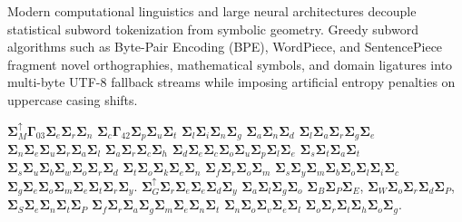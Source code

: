 \documentclass[10pt,oneside,letterpaper]{article}
\newcommand{\rosettaentry}[2]{%
  \begin{minipage}[t]{0.48\textwidth}
    \small\color{ink} #1
  \end{minipage}\hfill%
  \begin{minipage}[t]{0.48\textwidth}
    \small\ttfamily\color{cyan} #2
  \end{minipage}\par\vspace{0.4em}
}
\begin{document}
\rosettaentry{%
Modern computational linguistics and large neural architectures decouple statistical subword tokenization from symbolic geometry. Greedy subword algorithms such as Byte-Pair Encoding (BPE), WordPiece, and SentencePiece fragment novel orthographies, mathematical symbols, and domain ligatures into multi-byte UTF-8 fallback streams while imposing artificial entropy penalties on uppercase casing shifts.
}{%
$\mathbf{\Sigma}^\uparrow_M \mathbf{\Gamma}_{03} \mathbf{\Sigma}_e \mathbf{\Sigma}_r \mathbf{\Sigma}_n$ $\mathbf{\Sigma}_c \mathbf{\Gamma}_{42} \mathbf{\Sigma}_p \mathbf{\Sigma}_u \mathbf{\Sigma}_t$ $\mathbf{\Sigma}_l \mathbf{\Sigma}_i \mathbf{\Sigma}_n \mathbf{\Sigma}_g$ $\mathbf{\Sigma}_a \mathbf{\Sigma}_n \mathbf{\Sigma}_d$ $\mathbf{\Sigma}_l \mathbf{\Sigma}_a \mathbf{\Sigma}_r \mathbf{\Sigma}_g \mathbf{\Sigma}_e$ $\mathbf{\Sigma}_n \mathbf{\Sigma}_e \mathbf{\Sigma}_u \mathbf{\Sigma}_r \mathbf{\Sigma}_a \mathbf{\Sigma}_l$ $\mathbf{\Sigma}_a \mathbf{\Sigma}_r \mathbf{\Sigma}_c \mathbf{\Sigma}_h$ $\mathbf{\Sigma}_d \mathbf{\Sigma}_e \mathbf{\Sigma}_c \mathbf{\Sigma}_o \mathbf{\Sigma}_u \mathbf{\Sigma}_p \mathbf{\Sigma}_l \mathbf{\Sigma}_e$ $\mathbf{\Sigma}_s \mathbf{\Sigma}_t \mathbf{\Sigma}_a \mathbf{\Sigma}_t$ $\mathbf{\Sigma}_s \mathbf{\Sigma}_u \mathbf{\Sigma}_b \mathbf{\Sigma}_w \mathbf{\Sigma}_o \mathbf{\Sigma}_r \mathbf{\Sigma}_d$ $\mathbf{\Sigma}_t \mathbf{\Sigma}_o \mathbf{\Sigma}_k \mathbf{\Sigma}_e \mathbf{\Sigma}_n$ $\mathbf{\Sigma}_f \mathbf{\Sigma}_r \mathbf{\Sigma}_o \mathbf{\Sigma}_m$ $\mathbf{\Sigma}_s \mathbf{\Sigma}_y \mathbf{\Sigma}_m \mathbf{\Sigma}_b \mathbf{\Sigma}_o \mathbf{\Sigma}_l \mathbf{\Sigma}_i \mathbf{\Sigma}_c$ $\mathbf{\Sigma}_g \mathbf{\Sigma}_e \mathbf{\Sigma}_o \mathbf{\Sigma}_m \mathbf{\Sigma}_e \mathbf{\Sigma}_t \mathbf{\Sigma}_r \mathbf{\Sigma}_y$. $\mathbf{\Sigma}^\uparrow_G \mathbf{\Sigma}_r \mathbf{\Sigma}_e \mathbf{\Sigma}_e \mathbf{\Sigma}_d \mathbf{\Sigma}_y$ $\mathbf{\Sigma}_a \mathbf{\Sigma}_l \mathbf{\Sigma}_g \mathbf{\Sigma}_o$ $\mathbf{\Sigma}_B \mathbf{\Sigma}_P \mathbf{\Sigma}_E$, $\mathbf{\Sigma}_W \mathbf{\Sigma}_o \mathbf{\Sigma}_r \mathbf{\Sigma}_d \mathbf{\Sigma}_P$, $\mathbf{\Sigma}_S \mathbf{\Sigma}_e \mathbf{\Sigma}_n \mathbf{\Sigma}_t \mathbf{\Sigma}_P$ $\mathbf{\Sigma}_f \mathbf{\Sigma}_r \mathbf{\Sigma}_a \mathbf{\Sigma}_g \mathbf{\Sigma}_m \mathbf{\Sigma}_e \mathbf{\Sigma}_n \mathbf{\Sigma}_t$ $\mathbf{\Sigma}_n \mathbf{\Sigma}_o \mathbf{\Sigma}_v \mathbf{\Sigma}_e \mathbf{\Sigma}_l$ $\mathbf{\Sigma}_o \mathbf{\Sigma}_r \mathbf{\Sigma}_t \mathbf{\Sigma}_h \mathbf{\Sigma}_o \mathbf{\Sigma}_g$.
}
\end{document}
